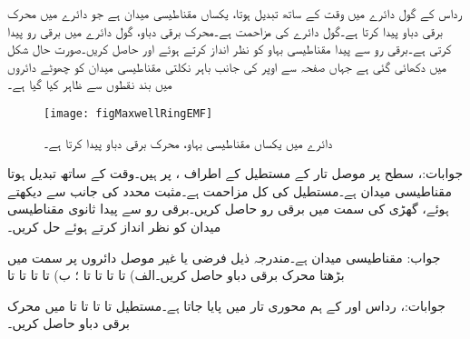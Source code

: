 
رداس  کے گول دائرے میں وقت کے ساتھ تبدیل ہوتا، یکساں مقناطیسی میدان  ہے جو دائرے میں محرک برقی دباو  پیدا کرتا ہے۔گول دائرے کی مزاحمت  ہے۔محرک برقی دباو،  گول دائرے میں برقی رو  پیدا کرتی ہے۔برقی رو  سے پیدا مقناطیسی بہاو کو نظر انداز کرتے ہوئے  اور  حاصل کریں۔صورت حال شکل  میں دکھائی گئی ہے جہاں صفحہ سے اوپر کی جانب باہر نکلتی مقناطیسی میدان کو چھوٹے دائروں میں بند نقطوں سے ظاہر کیا گیا ہے۔
\begin{figure}
\centering
\texttt{[image: figMaxwellRingEMF]}
\caption{دائرے میں یکساں مقناطیسی بہاو، محرک برقی دباو پیدا کرتا ہے۔}
\label{شکل_سوال_میکس_ویل_دائرہ_محرک_دباو}
\end{figure}

جوابات:، 
سطح  پر موصل تار کے مستطیل کے اطراف ،  پر ہیں۔وقت کے ساتھ تبدیل ہوتا مقناطیسی میدان  ہے۔مستطیل کی کل مزاحمت  ہے۔مثبت  محدد کی جانب سے دیکھتے ہوئے، گھڑی کی سمت میں برقی رو حاصل کریں۔برقی رو سے پیدا ثانوی مقناطیسی میدان کو نظر انداز کرتے ہوئے حل کریں۔

جواب: 
مقناطیسی میدان  ہے۔مندرجہ ذیل فرضی یا غیر موصل دائروں پر  سمت میں بڑھتا محرک برقی دباو حاصل کریں۔الف)  تا  تا  تا  تا ؛ ب)  تا  تا  تا  تا  

جوابات:، 
رداس  اور  کے ہم محوری تار
 میں  پایا جاتا ہے۔مستطیل  تا  تا  تا  تا    میں محرک برقی دباو حاصل کریں۔


